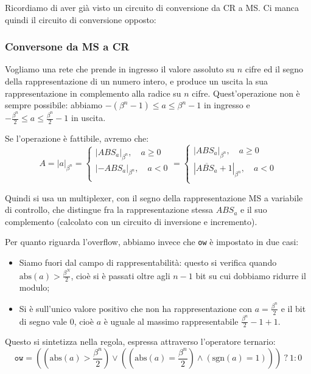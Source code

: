 \documentclass[a4paper,11pt]{article}
\begin{document}
Ricordiamo di aver già visto un circuito di conversione da CR a MS.
Ci manca quindi il circuito di conversione opposto:

\subsubsection{Conversone da MS a CR}
Vogliamo una rete che prende in ingresso il valore assoluto su $n$ cifre ed il segno della rappresentazione di un numero intero, e produce un uscita la sua rappresentazione in complemento alla radice su $n$ cifre.
Quest'operazione non è sempre possibile: abbiamo $-(\beta^n - 1) \leq a \leq \beta^n - 1$ in ingresso e $-\frac{\beta^n}{2} \leq a \leq \frac{\beta^n}{2} - 1$ in uscita.

Se l'operazione è fattibile, avremo che:
$$
A = |a|_{\beta^n} =
\begin{cases}
	|ABS_a|_{\beta^n}, \quad a \geq 0 \\ 
	|-ABS_a|_{\beta^n}, \quad a < 0 \\ 
\end{cases} = 
\begin{cases}
	|ABS_a|_{\beta^n}, \quad a \geq 0 \\ 
	|\overline{ABS_a} + 1|_{\beta^n}, \quad a < 0 \\ 
\end{cases} 
$$

Quindi si usa un multiplexer, con il segno della rappresentazione MS a variabile di controllo, che distingue fra la rappresentazione stessa $ABS_a$ e il suo complemento (calcolato con un circuito di inversione e incremento).

Per quanto riguarda l'overflow, abbiamo invece che \lstinline|ow| è impostato in due casi:
\begin{itemize}
	\item Siamo fuori dal campo di rappresentabilità: questo si verifica quando $\mathrm{abs}(a) > \frac{\beta^N}{2}$, cioè si è passati oltre agli $n-1$ bit su cui dobbiamo ridurre il modulo;
	\item Si è sull'unico valore positivo che non ha rappresentazione con $a = \frac{\beta^n}{2}$ e il bit di segno vale 0, cioè $a$ è uguale al massimo rappresentabile $\frac{\beta^n}{2} - 1 + 1$. 
\end{itemize}

Questo si sintetizza nella regola, espressa attraverso l'operatore ternario:
$$
\mathtt{ow} = \left( \left( \mathrm{abs}(a) > \frac{\beta^n}{2} \right) \vee \left( \left( \mathrm{abs}(a) = \frac{\beta^n}{2} \right) \wedge \left( \mathrm{sgn}(a) = 1 \right) \right) \right) \ ? \ 1 : 0
$$
\end{document}
